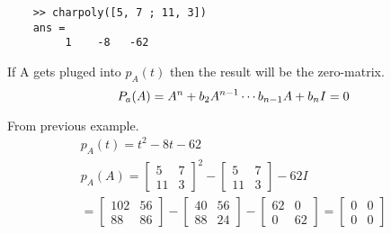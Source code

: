 \begin{matlab}
    \begin{lstlisting}
    >> charpoly([5, 7 ; 11, 3])
    ans =
         1    -8   -62
   \end{lstlisting}
\end{matlab}
If  A gets pluged into \(p_A(t)\) then the result will be the zero-matrix.
\begin{equation}
    P_a(A) = A^n + b_2 A^{n-1} \cdots b_{n-1} A + b_n I = 0 \\
\end{equation}
\begin{example}
    From previous example.
    \begin{gather*}
        p_A(t) = t^2 - 8t - 62 \\
        p_A(A) =  \begin{bmatrix}
            5 & 7 \\ 11 & 3
        \end{bmatrix}^2  - \begin{bmatrix}
            5 & 7 \\ 11 & 3
        \end{bmatrix} - 62 I \\
        = \begin{bmatrix}
            102 & 56 \\ 88 & 86
        \end{bmatrix} - \begin{bmatrix}
            40 & 56 \\ 88 & 24
        \end{bmatrix} - \begin{bmatrix}
            62 & 0 \\ 0 & 62
        \end{bmatrix} = \begin{bmatrix}
            0 & 0 \\ 0 & 0
        \end{bmatrix}
    \end{gather*}
\end{example}
